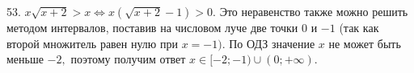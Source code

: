 53. $x\sqrt{x+2}>x\Leftrightarrow x(\sqrt{x+2}-1)>0.$ Это неравенство также можно решить методом интервалов, поставив на числовом луче две точки 0 и $-1$ (так как второй множитель равен нулю при  $x=-1).$ По ОДЗ значение $x$ не может быть меньше $-2,$ поэтому получим ответ $x\in[-2;-1)\cup(0;+\infty).$\newpage\noindent
